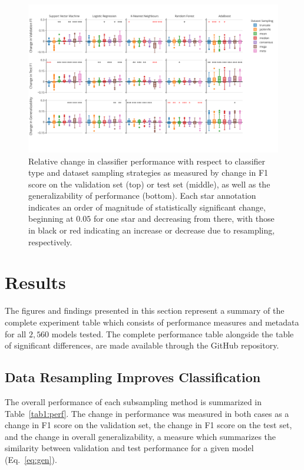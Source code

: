 \documentclass[10pt]{SelfArx} %
\newcommand{\new}[1]{\color{blue}#1\color{black}\xspace}
\begin{document}
\begin{figure}[bth!]\centering
\includegraphics[width=\linewidth]{figures/1.pdf}
\caption{Relative change in classifier performance with respect to classifier type and dataset sampling strategies as
measured by change in F1 score on the validation set (top) or test set (middle), as well as the generalizability of
performance (bottom). Each star annotation indicates an order of magnitude of statistically significant change,
beginning at $0.05$ for one star and decreasing from there, with those in black or red indicating an increase or
decrease due to resampling, respectively.}
\label{fig:overall_perf}
\end{figure}

\section*{Results}

The figures and findings presented in this section represent a summary of the complete experiment table which consists
of performance measures and metadata for all $2,560$ models tested. The complete performance table alongside the table
of significant differences, are made available through the GitHub repository.

\subsection*{Data Resampling Improves Classification}

The overall performance of each subsampling method is summarized in Table~\ref{tab1:perf}. The change in performance
was measured in both cases as a change in F1 score on the validation set, the change in F1 score on the test set, and
the change in overall generalizability, a measure which summarizes the similarity between validation and test
performance for a given model \new{(Eq.~\ref{eq:gen})}.
\end{document}
